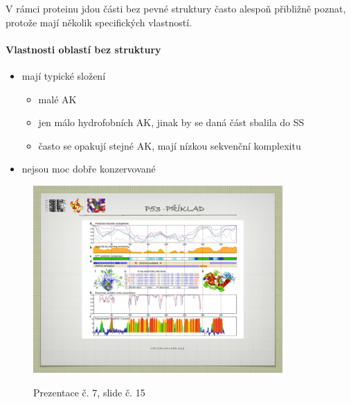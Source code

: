 \documentclass[DIV=8]{scrreprt}
\begin{document}
V rámci proteinu jdou části bez pevné struktury často alespoň přibližně poznat, protože mají několik specifických vlastností.

\paragraph{Vlastnosti oblastí bez struktury}
\begin{itemize}[nosep]
    \item mají typické složení
\begin{itemize}[nosep]
    \item malé AK
    \item jen málo hydrofobních AK, jinak by se daná část sbalila do SS
    \item často se opakují stejné AK, mají nízkou sekvenční komplexitu
\end{itemize}

    \item nejsou moc dobře konzervované
\end{itemize}



\begin{figure}
    \caption{Prezentace č. 7, slide č. 15}
    \includegraphics[width=0.85\textwidth]{slides-7/slide-15.jpg}
    \centering
    \label{slides-7-slide-15}
\end{figure}
\end{document}
